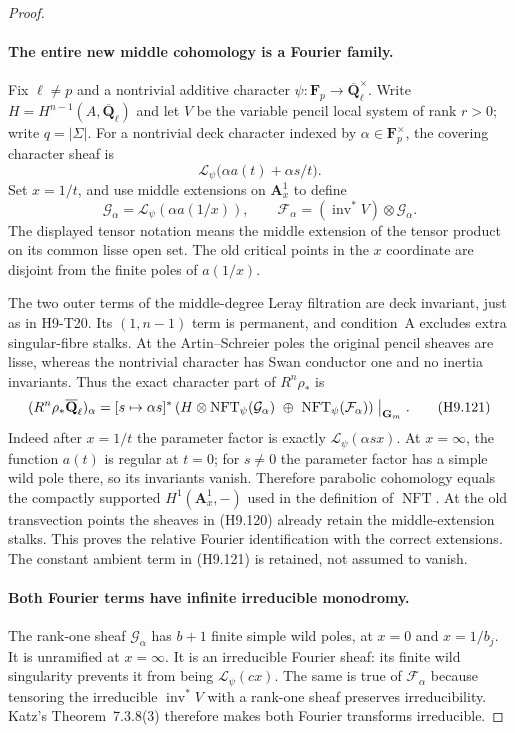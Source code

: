 \begin{proof}
\paragraph{The entire new middle cohomology is a Fourier family.}
Fix $\ell\ne p$ and a nontrivial additive character
$\psi:\mathbf F_p\to\overline{\mathbf Q}_\ell^\times$.
Write $H=H^{n-1}(A,\overline{\mathbf Q}_\ell)$ and let
$V$ be the variable pencil local system of rank $r>0$;
write $q=|\Sigma|$. For a nontrivial deck character
indexed by $\alpha\in\mathbf F_p^\times$, the covering
character sheaf is
\[
             \mathcal L_\psi\bigl(\alpha a(t)+\alpha s/t\bigr).
\]
Set $x=1/t$, and use middle extensions on
$\mathbf A^1_x$ to define
\[
 \mathcal G_\alpha=\mathcal L_\psi(\alpha a(1/x)),\qquad
 \mathcal F_\alpha=(\operatorname{inv}^*V)\otimes\mathcal G_\alpha.
                                                               \tag{H9.120}
\]
The displayed tensor notation means the middle
extension of the tensor product on its common lisse
open set. The old critical points in the $x$ coordinate
are disjoint from the finite poles of $a(1/x)$.

The two outer terms of the middle-degree Leray
filtration are deck invariant, just as in H9-T20.
Its $(1,n-1)$ term is permanent, and condition~A
excludes extra singular-fibre stalks. At the
Artin--Schreier poles the original pencil sheaves
are lisse, whereas the nontrivial character has
Swan conductor one and no inertia invariants. Thus
the exact character part of $R^n\rho_*$ is
\[
 (R^n\rho_*\overline{\mathbf Q}_\ell)_\alpha
  =[s\mapsto\alpha s]^*
     \left(
        H\otimes\operatorname{NFT}_\psi(\mathcal G_\alpha)
           \ \oplus\ \operatorname{NFT}_\psi(\mathcal F_\alpha)
     \right)\bigm|_{\mathbf G_m}.
                                                               \tag{H9.121}
\]
Indeed after $x=1/t$ the parameter factor is exactly
$\mathcal L_\psi(\alpha sx)$. At $x=\infty$, the
function $a(t)$ is regular at $t=0$; for $s\ne0$
the parameter factor has a simple wild pole there,
so its invariants vanish. Therefore parabolic
cohomology equals the compactly supported
$H^1(\mathbf A^1_x,-)$ used in the definition of
$\operatorname{NFT}$. At the old transvection
points the sheaves in (H9.120) already retain the
middle-extension stalks. This proves the relative
Fourier identification with the correct extensions.
The constant ambient term in (H9.121) is retained,
not assumed to vanish.

\paragraph{Both Fourier terms have infinite irreducible monodromy.}
The rank-one sheaf $\mathcal G_\alpha$ has $b+1$
finite simple wild poles, at $x=0$ and $x=1/b_j$.
It is unramified at $x=\infty$. It is an irreducible
Fourier sheaf: its finite wild singularity prevents
it from being $\mathcal L_\psi(cx)$.
The same is true of $\mathcal F_\alpha$ because
tensoring the irreducible $\operatorname{inv}^*V$
with a rank-one sheaf preserves irreducibility.
Katz's Theorem~7.3.8(3) therefore makes both Fourier
transforms irreducible.


\end{proof}
